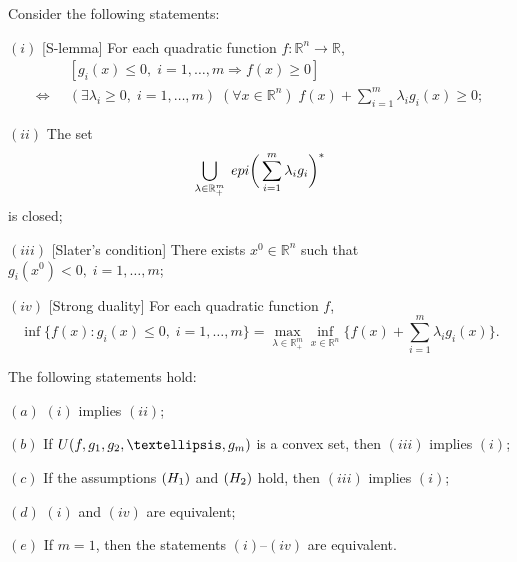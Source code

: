 \documentclass[10pt,a4paper]{amsart}
\begin{document}
	\begin{theorem}\label{Theo7} 
		Consider the following statements:
		\begin{description}
			\item{$(i)$} {\rm [S-lemma]} For each quadratic function $f:\mathbb{R}^n\to \mathbb{R}$,
			\begin{align*}
				&[g_i(x)\leq 0,\; i=1, \ldots, m \Rightarrow f(x)\geq 0] \\[0.3em]
				\Leftrightarrow \; \; &(\exists \lambda_i\geq0,\; i=1, \ldots, m)\; (\forall x\in \mathbb{R}^n)\;  
				f(x)+\sum_{i=1}^{m}\lambda_ig_i(x)\geq 0;
			\end{align*}
			
			\item{$(ii)$} The set
			$$\bigcup_{\lambda\in  \mathbb{R}^m_+} \; {\rm epi}\bigg(\sum_{i=1}^{m}\lambda_ig_i\bigg)^*$$
			is closed;
			
			\item{$(iii)$} {\rm [Slater's condition]} There exists $x^0\in \mathbb{R}^n$ such that
			$g_i(x^0)< 0,\; i=1, \ldots, m$;
			
			\item{$(iv)$} {\rm [Strong duality]} For each quadratic function $f$,
			\begin{equation}\label{e11} 
				\inf \{f(x): g_i(x)\leq 0,\; i=1,\ldots,m\}
				=\max_{\lambda\in \mathbb{R}^m_+}\inf_{x\in \mathbb{R}^n}
				\bigg\{f(x)+\sum_{i=1}^{m}\lambda_ig_i(x)\bigg\}.
			\end{equation}
		\end{description}
		The following statements hold:
		\begin{description}
			\item{$(a)$} $(i)$ implies $(ii)$;
			
			\item{$(b)$} If ${\rm U}(f, g_1, g_2,\ldots,g_m)$ is a convex set, then $(iii)$ implies $(i)$; 
			
			\item{$(c)$} If the assumptions $({\rm H_1})$ and $({\rm H_2})$ hold, then $(iii)$ implies $(i)$;
			
			\item{$(d)$} $(i)$ and $(iv)$ are equivalent;
			
			\item{$(e)$} If $m=1$, then the statements $(i)$--$(iv)$ are equivalent.
		\end{description}
	\end{theorem}
\end{document}
